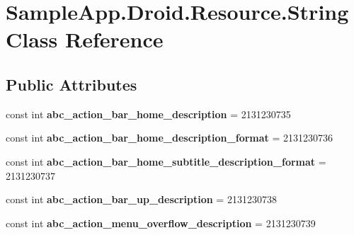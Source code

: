 \hypertarget{class_sample_app_1_1_droid_1_1_resource_1_1_string}{}\section{Sample\+App.\+Droid.\+Resource.\+String Class Reference}
\label{class_sample_app_1_1_droid_1_1_resource_1_1_string}
\subsection*{Public Attributes}
\begin{DoxyCompactItemize}
\item 
\mbox{\label{class_sample_app_1_1_droid_1_1_resource_1_1_string_a481a507d0b676d01ca24de728748b42a}} 
const int {\bfseries abc\+\_\+action\+\_\+bar\+\_\+home\+\_\+description} = 2131230735
\item 
\mbox{\label{class_sample_app_1_1_droid_1_1_resource_1_1_string_a67f166b0fce45bc3ac3e9c44422acbe3}} 
const int {\bfseries abc\+\_\+action\+\_\+bar\+\_\+home\+\_\+description\+\_\+format} = 2131230736
\item 
\mbox{\label{class_sample_app_1_1_droid_1_1_resource_1_1_string_a0bdad916180acec34ab36a61794a5e90}} 
const int {\bfseries abc\+\_\+action\+\_\+bar\+\_\+home\+\_\+subtitle\+\_\+description\+\_\+format} = 2131230737
\item 
\mbox{\label{class_sample_app_1_1_droid_1_1_resource_1_1_string_ae20e7cb75ee9cae99324229a46646e84}} 
const int {\bfseries abc\+\_\+action\+\_\+bar\+\_\+up\+\_\+description} = 2131230738
\item 
\mbox{\label{class_sample_app_1_1_droid_1_1_resource_1_1_string_a11bbc13d91e26b83e185b4950723e40a}} 
const int {\bfseries abc\+\_\+action\+\_\+menu\+\_\+overflow\+\_\+description} = 2131230739
\item 
\mbox{\label{class_sample_app_1_1_droid_1_1_resource_1_1_string_ac2e001b42a00c31f87e7f2842b736302}} 

\end{DoxyCompactItemize}
